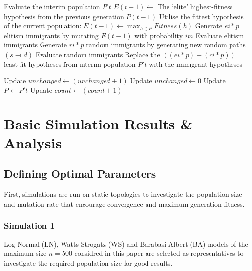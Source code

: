 \documentclass[
	a4paper, %
	10pt, %
	unnumberedsections, %
	twoside, %
]{LTJournalArticle}
\begin{document}
\begin{algorithm}[H]
	\begin{algorithmic}[30]
					\State Evaluate the interim population $P't$
					\State $E(t-1) \leftarrow$ The `elite' highest-fitness hypothesis from the previous generation $P(t-1)$ 
							\State Utilise the fittest hypothesis of the current population: 
							\State $E(t - 1) \leftarrow \max_{h \in P} Fitness(h)$ 
						\EndIf
						\State Generate $ei * p$ elitism immigrants by mutating $E(t-1)$ with probability $im$ 
						\State Evaluate elitism immigrants 
					\EndIf
						\State Generate $ri * p$ random immigrants by generating new random paths \((s \rightarrow d)\) 
						\State Evaluate random immigrants 
					\EndIf
					\State Replace the $((ei * p) + (ri * p))$ least fit hypotheses from interim population $P't$ with the immigrant hypotheses 
					
						\State Update $unchanged \leftarrow (unchanged + 1)$
					\Else 
						\State Update $unchanged \leftarrow 0$ 
					\EndIf
					\State Update $P \leftarrow P't$
					\State Update $count \leftarrow (count + 1)$ 		
	\end{algorithmic}
	\label{alg:higa} 
\end{algorithm}

\section{Basic Simulation Results \& Analysis} 



\subsection{Defining Optimal Parameters} 

First, simulations are run on static topologies to investigate the population size and mutation rate that encourage convergence and maximum generation fitness. 

\subsubsection{Simulation 1} Log-Normal (LN), Watts-Strogatz (WS) and Barabasi-Albert (BA) models of the maximum size \(n = 500\) considred in this paper are selected as representatives to investigate the required population size for good results. 
\end{document}

